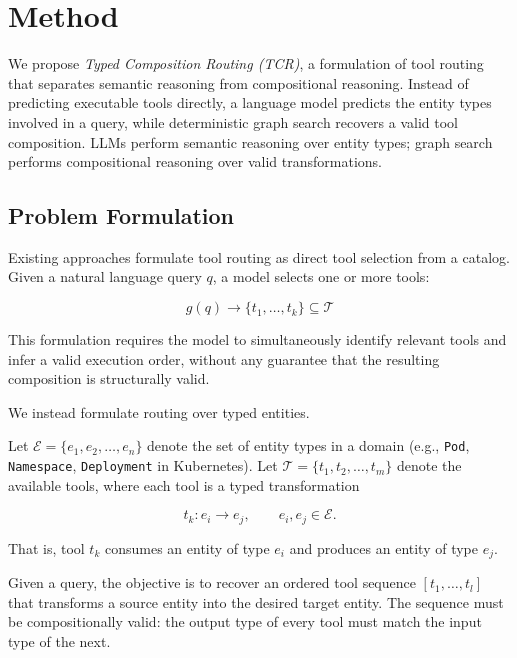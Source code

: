 \section{Method}
\label{sec:method}

We propose \emph{Typed Composition Routing (TCR)}, a formulation of tool routing that separates semantic reasoning from compositional reasoning.
Instead of predicting executable tools directly, a language model predicts the entity types involved in a query, while deterministic graph search recovers a valid tool composition.
LLMs perform semantic reasoning over entity types; graph search performs compositional reasoning over valid transformations.

\subsection{Problem Formulation}
\label{sec:problem-def}

Existing approaches formulate tool routing as direct tool selection from a catalog.
Given a natural language query $q$, a model selects one or more tools:

\begin{equation}
    g(q) \rightarrow \{t_1, \ldots, t_k\} \subseteq \mathcal{T}
\end{equation}

This formulation requires the model to simultaneously identify relevant tools and infer a valid execution order, without any guarantee that the resulting composition is structurally valid.

We instead formulate routing over typed entities.

Let $\mathcal{E} = \{e_1, e_2, \ldots, e_n\}$ denote the set of entity types in a domain (e.g., \texttt{Pod}, \texttt{Namespace}, \texttt{Deployment} in Kubernetes).
Let $\mathcal{T} = \{t_1, t_2, \ldots, t_m\}$ denote the available tools, where each tool is a typed transformation

\begin{equation}
    t_k : e_i \rightarrow e_j,
    \qquad
    e_i,e_j \in \mathcal{E}.
    \label{eq:tool-transform}
\end{equation}

That is, tool $t_k$ consumes an entity of type $e_i$ and produces an entity of type $e_j$.

Given a query, the objective is to recover an ordered tool sequence
$[t_1,\ldots,t_l]$
that transforms a source entity into the desired target entity.
The sequence must be compositionally valid: the output type of every tool must match the input type of the next.

